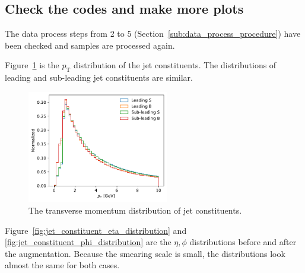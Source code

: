 \documentclass[12pt]{article}
\begin{document}
	\subsection{Check the codes and make more plots}%
	\label{sub:check_the_codes_and_make_more_plots}
		The data process steps from 2 to 5 (Section~\ref{sub:data_process_procedure}) have been checked and samples are processed again.

		Figure~\ref{fig:jet_constituent_pt_distribution} is the $p_\text{T}$ distribution of the jet constituents. The distributions of leading and sub-leading jet constituents are similar.
		\begin{figure}[htpb]
			\centering
			\includegraphics[width=0.55\textwidth]{hv_model_pt_distribution.pdf}
			\caption{The transverse momentum distribution of jet constituents.}
			\label{fig:jet_constituent_pt_distribution}
		\end{figure}

		Figure~\ref{fig:jet_constituent_eta_distribution} and \ref{fig:jet_constituent_phi_distribution} are the $\eta, \phi$ distributions before and after the augmentation. Because the smearing scale is small, the distributions look almost the same for both cases.
\end{document}
